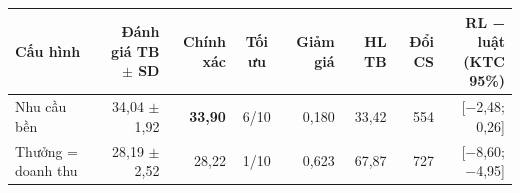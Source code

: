 \begin{tabular}{lrrcrrrr}
\toprule
Cấu hình & \makecell[r]{Đánh giá TB\\\(\pm\) SD} & Chính xác & Tối ưu & Giảm giá & HL TB & Đổi CS & \makecell[r]{RL − luật\\(KTC 95\%)} \\
\midrule
Nhu cầu bền & 34{,}04 $\pm$ 1{,}92 & \textbf{33{,}90} & 6/10 & 0{,}180 & 33{,}42 & 554 & [\ensuremath{-}2{,}48; 0{,}26] \\
Thưởng = doanh thu & 28{,}19 $\pm$ 2{,}52 & 28{,}22 & 1/10 & 0{,}623 & 67{,}87 & 727 & [\ensuremath{-}8{,}60; \ensuremath{-}4{,}95] \\
\bottomrule
\end{tabular}

